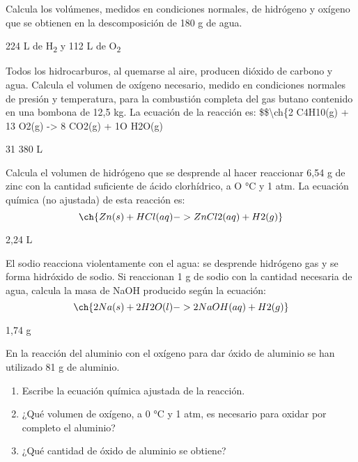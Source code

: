 \documentclass[
]{article}
\providecommand{\tightlist}{%
  \setlength{\itemsep}{0pt}\setlength{\parskip}{0pt}}
\begin{document}
\begin{exercise}Calcula los volúmenes, medidos en condiciones normales,
de hidrógeno y oxígeno que se obtienen en la descomposición de 180 g de
agua.\end{exercise}

\begin{solution}224 L de H\textsubscript{2} y 112 L de
O\textsubscript{2}\end{solution}

\begin{exercise}Todos los hidrocarburos, al quemarse al aire, producen
dióxido de carbono y agua. Calcula el volumen de oxígeno necesario,
medido en condiciones normales de presión y temperatura, para la
combustión completa del gas butano contenido en una bombona de 12,5 kg.
La ecuación de la reacción es: \$\$\textbackslash ch\{2 C4H10(g) + 13
O2(g) -\textgreater{} 8 CO2(g) + 1O H2O(g)\end{exercise}

\begin{solution}31 380 L\end{solution}

\begin{exercise}Calcula el volumen de hidrógeno que se desprende al
hacer reaccionar 6,54 g de zinc con la cantidad suficiente de ácido
clorhídrico, a O °C y 1 atm. La ecuación química (no ajustada) de esta
reacción es: \[\ch{Zn(s) + HCl(aq) -> ZnCl2(aq) + H2(g)}\]\end{exercise}

\begin{solution}2,24 L\end{solution}

\begin{exercise}El sodio reacciona violentamente con el agua: se
desprende hidrógeno gas y se forma hidróxido de sodio. Si reaccionan 1 g
de sodio con la cantidad necesaria de agua, calcula la masa de NaOH
producido según la ecuación:
\[\ch{2 Na(s) + 2 H2O(l) -> 2 NaOH(aq) + H2(g)}\]\end{exercise}

\begin{solution}1,74 g\end{solution}

\begin{exercise}En la reacción del aluminio con el oxígeno para dar
óxido de aluminio se han utilizado 81 g de aluminio.

\begin{enumerate}
\def\labelenumi{\alph{enumi})}
\tightlist
\item
  Escribe la ecuación química ajustada de la reacción.
\item
  ¿Qué volumen de oxígeno, a 0 °C y 1 atm, es necesario para oxidar por
  completo el aluminio?
\item
  ¿Qué cantidad de óxido de aluminio se obtiene?
\end{enumerate}

\end{exercise}
\end{document}

